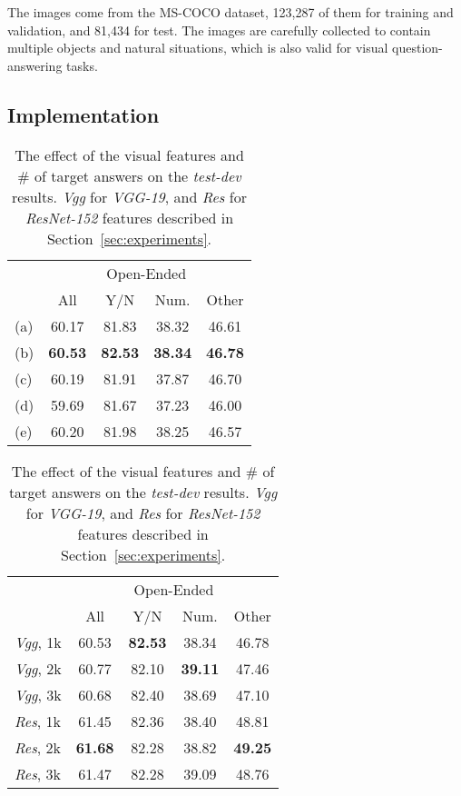 \documentclass{article}
\begin{document}
The images come from the MS-COCO dataset, 123,287 of them for training and validation, and 81,434 for test. The images are carefully collected to contain multiple objects and natural situations, which is also valid for visual question-answering tasks.

\subsection{Implementation}

\begin{table}[t!]
\centering
\begin{minipage}{.45\textwidth}
\caption{The results of alternative models (a)-(e) on the \textit{test-dev}.}
  \label{tab:alt_results}
  \centering
  \begin{tabular}{lcccc}
  \toprule
  & \multicolumn{4}{c}{Open-Ended}\\
  \cmidrule{2-5}
   & All & Y/N & Num. & Other \\
  \midrule
  (a) & 60.17 & 81.83 & 38.32 & 46.61 \\
  (b) & \textbf{60.53} & \textbf{82.53} & \textbf{38.34} & \textbf{46.78}  \\
  (c) & 60.19 & 81.91 & 37.87 & 46.70 \\
  (d) & 59.69 & 81.67 & 37.23 & 46.00 \\
  (e) & 60.20 & 81.98 & 38.25 & 46.57 \\
  \bottomrule
  \end{tabular}
\end{minipage}\hspace{10px}
\begin{minipage}{.49\textwidth}
  \caption{The effect of the visual features and \# of target answers on the \textit{test-dev} results. \textit{Vgg} for \textit{VGG-19}, and \textit{Res} for \textit{ResNet-152} features described in Section~\ref{sec:experiments}.}
  \label{tab:feat_results}
  \centering
  \begin{tabular}{lcccc}
  \toprule
  & \multicolumn{4}{c}{Open-Ended}\\
  \cmidrule{2-5}
   & All & Y/N & Num. & Other \\
  \midrule
  \textit{Vgg}, 1k & 60.53 & \textbf{82.53} & 38.34 & 46.78 \\
  \textit{Vgg}, 2k & 60.77 & 82.10 & \textbf{39.11} & 47.46 \\
  \textit{Vgg}, 3k & 60.68 & 82.40 & 38.69 & 47.10 \\
  \textit{Res}, 1k & 61.45 & 82.36 & 38.40 & 48.81 \\
  \textit{Res}, 2k & \textbf{61.68} & 82.28 & 38.82 & \textbf{49.25} \\
  \textit{Res}, 3k & 61.47 & 82.28 & 39.09 & 48.76 \\
  \bottomrule
  \end{tabular}
\end{minipage}
\end{table}
\end{document}
